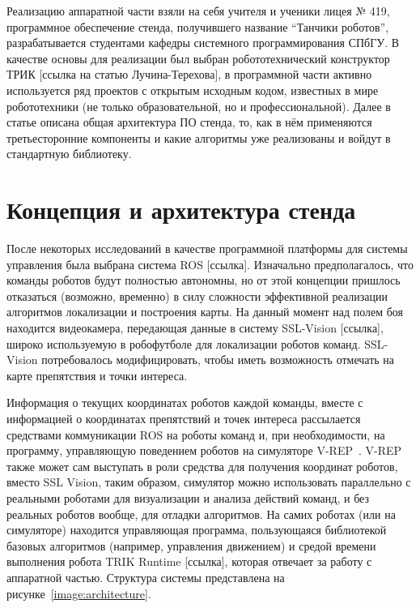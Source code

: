 \documentclass{spisok-article}
\begin{document}
Реализацию аппаратной части взяли на себя учителя и ученики лицея № 419, программное обеспечение стенда, получившего название ``Танчики роботов'', разрабатывается студентами кафедры системного программирования СПбГУ. В качестве основы для реализации был выбран робототехнический конструктор ТРИК [ссылка на статью Лучина-Терехова], в программной части активно используется ряд проектов с открытым исходным кодом, известных в мире робототехники (не только образовательной, но и профессиональной). Далее в статье описана общая архитектура ПО стенда, то, как в нём применяются третьесторонние компоненты и какие алгоритмы уже реализованы и войдут в стандартную библиотеку.

\section{Концепция и архитектура стенда}

После некоторых исследований в качестве программной платформы для системы управления была выбрана система ROS [ссылка]. Изначально предполагалось, что команды роботов будут полностью автономны, но от этой концепции пришлось отказаться (возможно, временно) в силу сложности эффективной реализации алгоритмов локализации и построения карты. На данный момент над полем боя находится видеокамера, передающая данные в систему SSL-Vision [ссылка], широко используемую в робофутболе для локализации роботов команд. SSL-Vision потребовалось модифицировать, чтобы иметь возможность отмечать на карте препятствия и точки интереса. 

Информация о текущих координатах роботов каждой команды, вместе с информацией о координатах препятствий и точек интереса рассылается средствами коммуникации ROS на роботы команд и, при необходимости, на программу, управляющую поведением роботов на симуляторе V-REP~\cite{vrep2013}. V-REP также может сам выступать в роли средства для получения координат роботов, вместо SSL Vision, таким образом, симулятор можно использовать параллельно с реальными роботами для визуализации и анализа действий команд, и без реальных роботов вообще, для отладки алгоритмов. На самих роботах (или на симуляторе) находится управляющая программа, пользующаяся библиотекой базовых алгоритмов (например, управления движением) и средой времени выполнения робота TRIK Runtime [ссылка], которая отвечает за работу с аппаратной частью. Структура системы представлена на рисунке~\ref{image:architecture}.
\end{document}
